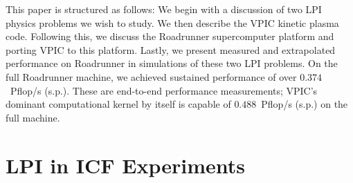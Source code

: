 \documentclass[journal,twoside]{IEEEtran}
\begin{document}
This paper is structured as follows: We begin with a discussion of two
LPI physics problems we wish to study.  We then describe the VPIC
kinetic plasma code.  Following this, we discuss the Roadrunner
supercomputer platform and porting VPIC to this platform.  Lastly, we
present measured and extrapolated performance on Roadrunner in
simulations of these two LPI problems.  On the full Roadrunner
machine, we achieved sustained performance of over $0.374$~Pflop/s
(s.p.).  These are end-to-end performance measurements; VPIC's
dominant computational kernel by itself is capable of $0.488$~Pflop/s
(s.p.) on the full machine.

\section{LPI in ICF Experiments}
\end{document}
